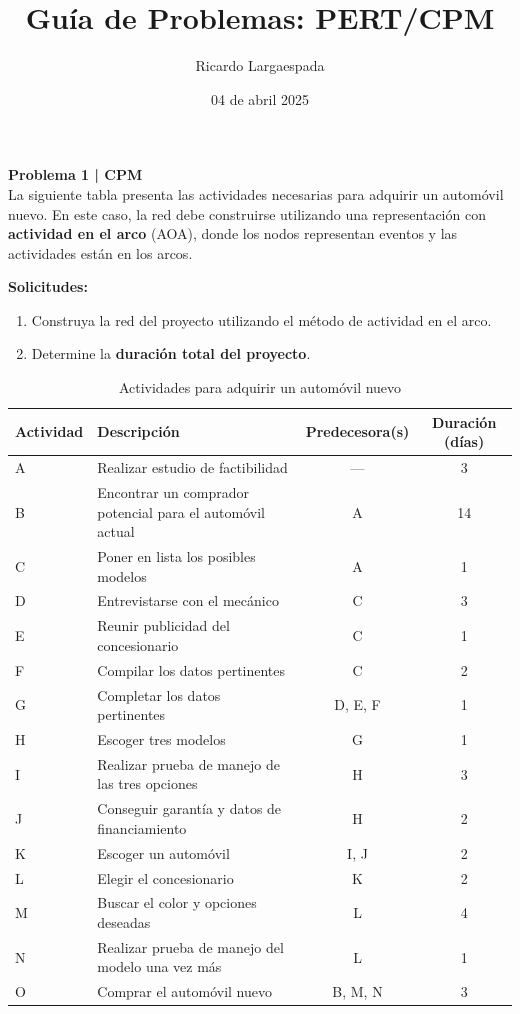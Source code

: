 \documentclass{article}
\title{Guía de Problemas: PERT/CPM}
\author{Ricardo Largaespada}
\date{04 de abril 2025}
\begin{document}
\maketitle

\begin{problem}
\textbf{Problema 1 | CPM}\\
La siguiente tabla presenta las actividades necesarias para adquirir un automóvil nuevo. En este caso, la red debe construirse utilizando una representación con \textbf{actividad en el arco} (AOA), donde los nodos representan eventos y las actividades están en los arcos.

\medskip

\textbf{Solicitudes:}
\begin{enumerate}
    \item Construya la red del proyecto utilizando el método de actividad en el arco.
    \item Determine la \textbf{duración total del proyecto}.
\end{enumerate}

\begin{table}[H]
\centering
\begin{tabular}{l p{6cm} c c}
\toprule
\textbf{Actividad} & \textbf{Descripción} & \textbf{Predecesora(s)} & \textbf{Duración (días)} \\
\midrule
A & Realizar estudio de factibilidad & --- & 3 \\
\hline
B & Encontrar un comprador potencial para el automóvil actual & A & 14 \\
\hline
C & Poner en lista los posibles modelos & A & 1 \\
\hline
D & Entrevistarse con el mecánico & C & 3 \\
\hline
E & Reunir publicidad del concesionario & C & 1 \\
\hline
F & Compilar los datos pertinentes & C & 2 \\
\hline
G & Completar los datos pertinentes & D, E, F & 1 \\
\hline
H & Escoger tres modelos & G & 1 \\
\hline
I & Realizar prueba de manejo de las tres opciones & H & 3 \\
\hline
J & Conseguir garantía y datos de financiamiento & H & 2 \\
\hline
K & Escoger un automóvil & I, J & 2 \\
\hline
L & Elegir el concesionario & K & 2 \\
\hline
M & Buscar el color y opciones deseadas & L & 4 \\
\hline
N & Realizar prueba de manejo del modelo una vez más & L & 1 \\
\hline
O & Comprar el automóvil nuevo & B, M, N & 3 \\
\bottomrule
\end{tabular}
\caption{Actividades para adquirir un automóvil nuevo}
\end{table}

\end{problem}
\end{document}
